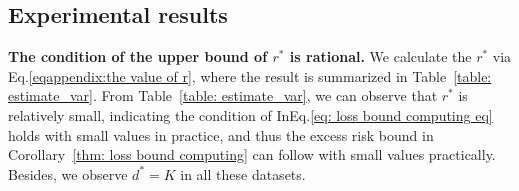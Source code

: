 \documentclass{article}
\begin{document}
\subsection{Experimental results}


\noindent\textbf{The condition of the upper bound of $r^*$ is rational.} We calculate the $r^*$ via Eq.\eqref{eqappendix:the value of r}, where the result is summarized in Table~\ref{table: estimate_var}. From Table~\ref{table: estimate_var}, we can observe that $r^*$ is relatively small, indicating the condition of InEq.\eqref{eq: loss bound computing eq} holds with small values in practice, and thus the excess risk bound in Corollary~\ref{thm: loss bound computing} can follow with small values practically.
Besides, we observe $d^* = K$ in all these datasets.

\end{document}
